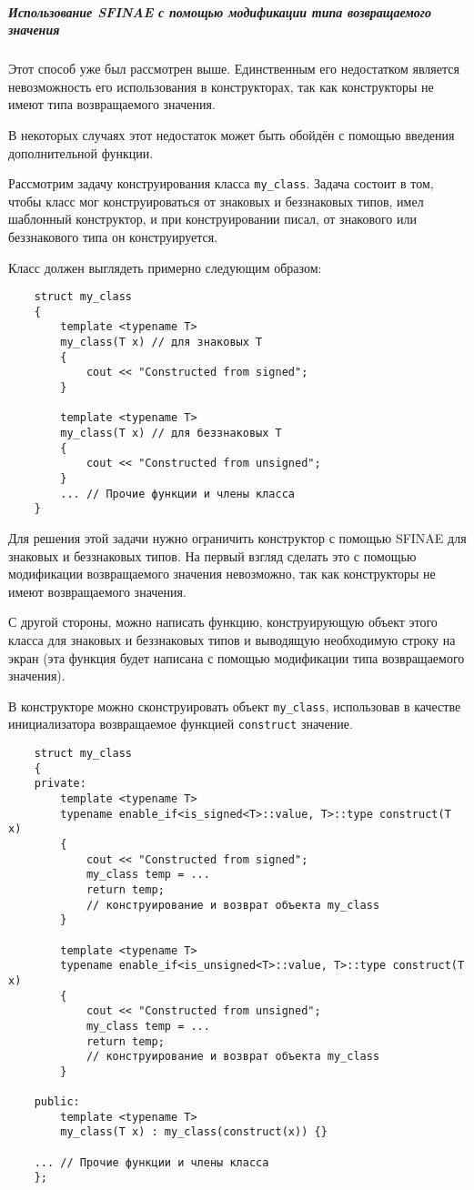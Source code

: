 \subparagraph{Использование SFINAE с помощью модификации типа возвращаемого значения \ \ \ \ \ \ \ \ \ \ \ \ \ \ \ }

	Этот способ уже был рассмотрен выше. Единственным его недостатком является невозможность его использования в конструкторах, так как конструкторы не имеют типа возвращаемого значения.
	
	В некоторых случаях этот недостаток может быть обойдён с помощью введения дополнительной функции.
	
	Рассмотрим задачу конструирования класса \texttt{my_class}. Задача состоит в том, чтобы класс мог конструироваться от знаковых и беззнаковых типов, имел шаблонный конструктор, и при конструировании писал, от знакового или беззнакового типа он конструируется.
	
	Класс должен выглядеть примерно следующим образом:
	
	\begin{verbatim}
	struct my_class
	{
		template <typename T>
		my_class(T x) // для знаковых T
		{
			cout << "Constructed from signed"; 
		}
		
		template <typename T>
		my_class(T x) // для беззнаковых T
		{
			cout << "Constructed from unsigned"; 
		}
		... // Прочие функции и члены класса
	}
	\end{verbatim}
	
	Для решения этой задачи нужно ограничить конструктор с помощью SFINAE для знаковых и беззнаковых типов. На первый взгляд сделать это с помощью модификации возвращаемого значения невозможно, так как конструкторы не имеют возвращаемого значения.
	
	С другой стороны, можно написать функцию, конструирующую объект этого класса для знаковых и беззнаковых типов и выводящую необходимую строку на экран (эта функция будет написана с помощью модификации типа возвращаемого значения).
	
	В конструкторе можно сконструировать объект \texttt{my_class}, использовав в качестве инициализатора возвращаемое функцией \texttt{construct} значение.
	
	\begin{verbatim}
	struct my_class
	{
	private:
		template <typename T>
		typename enable_if<is_signed<T>::value, T>::type construct(T x)
		{
			cout << "Constructed from signed"; 
			my_class temp = ...
			return temp;
			// конструирование и возврат объекта my_class 
		}
	
		template <typename T>
		typename enable_if<is_unsigned<T>::value, T>::type construct(T x)
		{
			cout << "Constructed from unsigned";
			my_class temp = ...
			return temp;
			// конструирование и возврат объекта my_class 
		}
		
	public:
		template <typename T>
		my_class(T x) : my_class(construct(x)) {}
		
	... // Прочие функции и члены класса
	};
	\end{verbatim}

